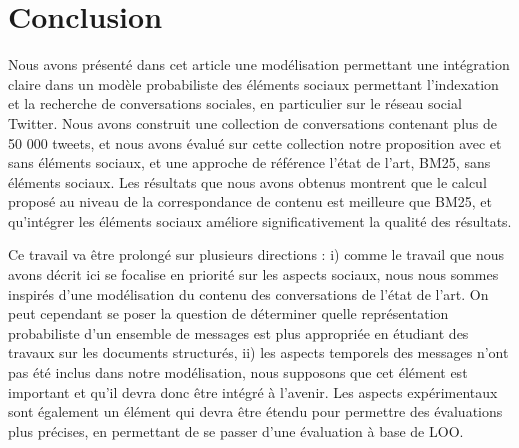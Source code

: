 \documentclass{article-hermes}
\begin{document}
\section{Conclusion}

\par Nous avons présenté dans cet article une modélisation permettant une
intégration claire dans un modèle probabiliste des éléments sociaux
permettant l'indexation et la recherche de conversations sociales, en
particulier sur le réseau social Twitter. Nous avons construit une
collection de conversations contenant plus de 50 000 tweets, et nous
avons évalué sur cette collection notre proposition avec et sans éléments sociaux, et une approche de référence
l'état de l'art, BM25, sans éléments sociaux. Les résultats que nous avons obtenus montrent que le calcul proposé au niveau de la correspondance de contenu est meilleure que BM25, et qu'intégrer les éléments sociaux améliore significativement la qualité des résultats.

\par Ce travail va être prolongé sur plusieurs directions : i) comme le
travail que nous avons décrit ici se focalise en priorité sur les
aspects sociaux, nous nous sommes inspirés d'une modélisation du contenu
des conversations de l'état de l'art. On peut cependant se poser la
question de déterminer quelle représentation probabiliste d'un ensemble
de messages est plus appropriée en étudiant des travaux sur les
documents structurés, ii) les aspects temporels des messages n'ont pas
été inclus dans notre modélisation, nous supposons que cet élément est
important et qu'il devra donc être intégré à l'avenir. Les aspects
expérimentaux sont également un élément qui devra être étendu pour
permettre des évaluations plus précises, en permettant de se passer
d'une évaluation à base de LOO.


\end{document}
